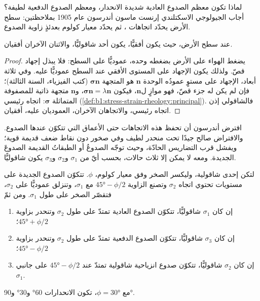 لماذا تكون معظم الصدوع العادية شديدة الانحدار، ومعظم الصدوع الدفعية لطيفة؟ أجاب الجيولوجي الاسكتلندي إرنست ماسون أندرسون عام 1905 بملاحظتين: سطح الأرض يحدّد اتجاهات ، ثم يحدّد معيار كولوم بعدئذٍ زاوية الصدوع.

\begin{proposition}\label{prop:b1:faults-folds-fabrics:free-surface}
عند سطح الأرض، حيث يكون أفقيًّا، يكون أحد  شاقوليًّا، والاثنان الآخران أفقيان.
\end{proposition}

\begin{proof}
يضغط الهواء على الأرض بضغطه وحده، عموديًّا على السطح: فلا يبذل إجهاد قصّ. ولذلك يكون الإجهاد على المستوى الأفقي عند السطح عموديًّا عليه. وفي ثلاثة أبعاد، الإجهاد على مستوٍ عمودُه الوحدة $\mathbf n$ هو المتجهة $\boldsymbol\sigma\mathbf n$ (كتب الفيزياء، السنة الثالثة)؛ فإن لم يكن له جزء قصّ، فهو موازٍ ل$\mathbf n$، فيكون $\boldsymbol\sigma\mathbf n = \lambda\mathbf n$، و$\mathbf n$ متجهة ذاتية للمصفوفة المتماثلة $\boldsymbol\sigma$: اتجاه رئيسي (\cref{def:b1:stress-strain-rheology:principal}). فالشاقولي إذن اتجاه رئيسي، والاتجاهان الآخران، العموديان عليه، أفقيان.
\end{proof}

افترض أندرسون أن  تحفظ هذه الاتجاهات حتى الأعماق التي تتكوّن عندها الصدوع. والافتراض صالح جيدًا تحت منحدر لطيف وفي صخور دون نقاط ضعف قديمة قوية؛ ويفشل قرب التضاريس الحادّة، وحيث توجّه الصدوعُ أو الطبقاتُ القديمة الصدوعَ الجديدة. ومعه لا يمكن إلا ثلاث حالات، بحسب أيّ من $\sigma_1$ و$\sigma_2$ و$\sigma_3$ يكون شاقوليًّا.

\begin{theorem}\label{thm:b1:faults-folds-fabrics:anderson}
لتكن إحدى  شاقولية، وليكسر الصخر وفق معيار كولوم،  $\phi$. تتكوّن الصدوع الجديدة على مستويات تحتوي اتجاه $\sigma_2$ وتصنع الزاوية $\ang{45} - \phi/2$ مع $\sigma_1$، وتنزلق عموديًّا على $\sigma_2$، فتقصّر الصخر على طول $\sigma_1$. ومن ثمّ
\begin{enumerate}[label=(\alph*)]
  \item إن كان $\sigma_1$ شاقوليًّا، تتكوّن الصدوع العادية تمتدّ على طول $\sigma_2$ وتنحدر بزاوية $\ang{45} + \phi/2$؛
  \item إن كان $\sigma_3$ شاقوليًّا، تتكوّن الصدوع الدفعية تمتدّ على طول $\sigma_2$ وتنحدر بزاوية $\ang{45} - \phi/2$؛
  \item إن كان $\sigma_2$ شاقوليًّا، تتكوّن صدوع انزياحية شاقولية تمتدّ عند $\ang{45} - \phi/2$ على جانبي $\sigma_1$.
\end{enumerate}
مع $\phi = \ang{30}$، تكون الانحدارات \ang{60} و\ang{30} و\ang{90}.
\end{theorem}

